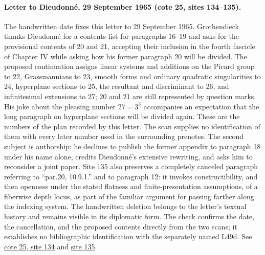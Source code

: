 \paragraph{Letter to Dieudonné, 29 September 1965 (cote 25, sites 134--135).}
The handwritten date fixes this letter to 29 September 1965. Grothendieck thanks Dieudonné for a contents list for paragraphs 16--19 and asks for the provisional contents of 20 and 21, accepting their inclusion in the fourth fascicle of Chapter IV while asking how his former paragraph 20 will be divided. The proposed continuation assigns linear systems and additions on the Picard group to 22, Grassmannians to 23, smooth forms and ordinary quadratic singularities to 24, hyperplane sections to 25, the resultant and discriminant to 26, and infinitesimal extensions to 27; 20 and 21 are still represented by question marks. His joke about the pleasing number $27=3^3$ accompanies an expectation that the long paragraph on hyperplane sections will be divided again. These are the numbers of the plan recorded by this letter. The scan supplies no identification of them with every later number used in the surrounding prenotes. The second subject is authorship: he declines to publish the former appendix to paragraph 18 under his name alone, credits Dieudonné's extensive rewriting, and asks him to reconsider a joint paper. Site 135 also preserves a completely canceled paragraph referring to ``par.20, 10.9.1.'' and to paragraph 12: it invokes constructibility, and then openness under the stated flatness and finite-presentation assumptions, of a fiberwise depth locus, as part of the familiar argument for passing farther along the indexing system. The handwritten deletion belongs to the letter's textual history and remains visible in its diplomatic form. The check confirms the date, the cancellation, and the proposed contents directly from the two scans; it establishes no bibliographic identification with the separately named L49d. See \href{https://grothendieck.umontpellier.fr/web/viewer.html?file=../25.pdf#page=135}{cote 25, site 134} and \href{https://grothendieck.umontpellier.fr/web/viewer.html?file=../25.pdf#page=136}{site 135}.
